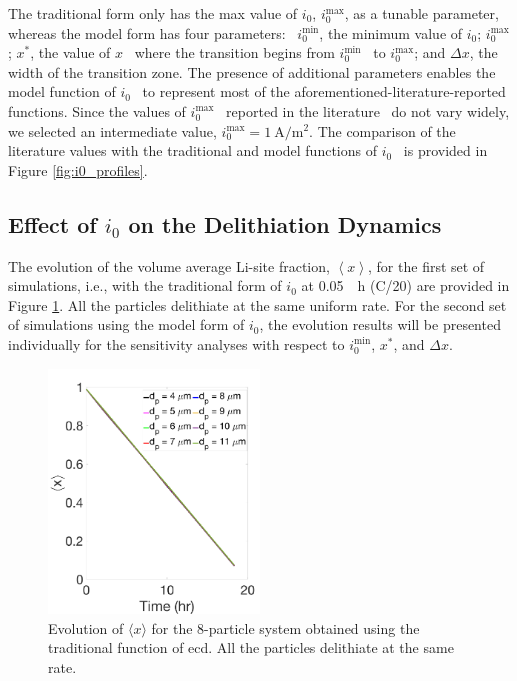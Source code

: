 \documentclass{article}
\begin{document}
The traditional form only has the max value of $i_0$,
$i_0^{\mathrm{max}}$, as a tunable parameter, whereas the model form
has four parameters: \ $i_0^{\mathrm{min}}$, the minimum value of
$i_0$; $i_0^{\mathrm{max}}$; $x^{\ast }$, the value of $x$ \ where the
transition begins from $i_0^{\mathrm{min}}$ \ to $i_0^{\mathrm{max}}$;
and $\Delta x$, the width of the transition zone. The presence of additional
parameters enables the model function of $i_0$ \ to represent most of
the aforementioned-literature-reported functions. Since the values of
$i_0^{\mathrm{max}}$ \ reported in the %
literature\cite{tsai2018,dees2008} \ do not vary widely, we selected
an intermediate value,
$i_0^{\mathrm{max}}=\SI{1}{\ampere\per\meter\squared}$. The comparison
of the literature values with the traditional and model functions of
$i_0$ \ is provided in Figure \ref{fig:i0_profiles}.

\subsection{Effect of $i_0$ on the Delithiation Dynamics}

The evolution of the volume average Li-site fraction, $\left\langle
x\right\rangle $, for the first set of simulations, i.e., with the
traditional form of $i_0$ at \SI{0.05}{\per\hour} (C/20) are provided
in Figure \ref{fig:x-evolution}. All the particles delithiate at the
same uniform rate. For the second set of simulations using the model
form of $i_0$, the evolution results will be presented individually
for the sensitivity analyses with respect to $i_0^{\mathrm{min}}$,
$x^{\ast}$, and $\Delta x$.

\begin{figure}
  \begin{center}
    \includegraphics[width=0.5\textwidth]{8-particle-evolution.pdf}
  \end{center}
  \caption{Evolution of $\langle x \rangle$ for the 8-particle system
    obtained using the traditional function of \gls{ecd}. All the
    particles delithiate at the same rate.}
  \label{fig:x-evolution}
\end{figure}
\end{document}

